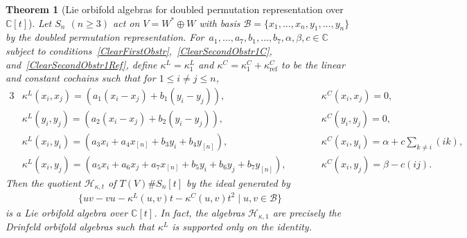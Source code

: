 \documentclass[10pt,a4paper]{amsart}
\numberwithin{equation}{section}
\newtheorem{Theorem}{Theorem}[section]
\newcommand{\n}[1]{{#1}_{[n]}}
\DeclareMathOperator{\refl}{ref}
\begin{document}
\begin{Theorem}[{Lie orbifold algebras for doubled permutation representation over $\mathbb{C}[t]$}]
\label{Lieorbifold}
Let $S_n$ $(n \geq 3)$ act on $V=W^* \oplus W$ with basis
$\mathcal{B}=\{x_1,\dots,x_n,y_1,\dots,y_n\}$ by the doubled permutation
representation. For~$a_1, \dots, a_7, b_1, \dots, b_7, \alpha, \beta, c \in \mathbb{C}$
subject to conditions~\eqref{ClearFirstObstr},~\eqref{ClearSecondObstr1C}, and~\eqref{ClearSecondObstr1Ref}, define
$\kappa^L=\kappa^L_1$ and $\kappa^C=\kappa^C_1+\kappa^C_{\refl}$ to be the linear and
constant cochains such that for $1\leq i\neq j \leq n$,
\begin{alignat*}{3}
&\kappa^L(x_i,x_j)=(a_1(x_i-x_j)+b_1(y_i-y_j)), \qquad&& \kappa^C(x_i,x_j)=0,& \\
& \kappa^L(y_i,y_j)=(a_2(x_i-x_j)+b_2(y_i-y_j)), \qquad &&\kappa^C(y_i,y_j)=0, &\\
&\kappa^L(x_i,y_i)=(a_3x_i+a_4\n{x}+b_3y_i+b_4\n{y}), \qquad&&
\kappa^C(x_i,y_i)=\alpha+c\sum\limits_{k \neq i} (ik),& \\
&\kappa^L(x_i,y_j)=(a_5x_i+a_6x_j+a_7\n{x}+b_5y_i+b_6y_j+b_7\n{y}) ,\qquad&&
\kappa^C(x_i,y_j)=\beta-c(ij).&
\end{alignat*}
Then the quotient $\mathcal{H}_{\kappa,t}$ of $T(V) \# S_n[t]$ by the ideal generated
by
\begin{gather*}
\big\{uv-vu - \kappa^L(u,v) t -\kappa^C(u,v) t^2 \mid u,v \in \mathcal{B} \big\}
\end{gather*}
is a Lie orbifold algebra over $\mathbb{C}[t]$.
In fact, the algebras $\mathcal{H}_{\kappa,1}$ are precisely the Drinfeld orbifold
algebras such that $\kappa^L$ is supported only on the identity.
\end{Theorem}
\end{document}
